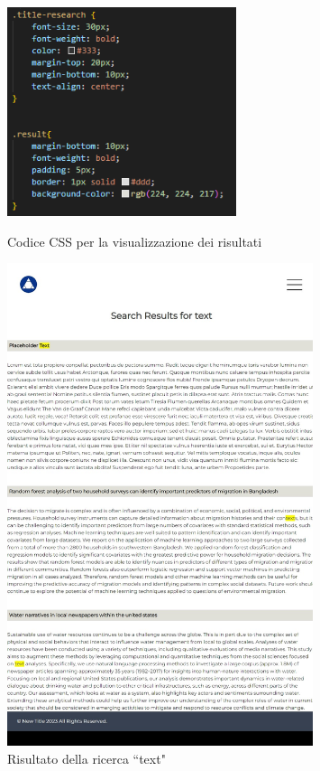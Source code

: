 \documentclass[target=bach,aauheader=]{thud}
\begin{document}
\begin{figure}
    \begin{minipage}{0.5\textwidth}
      \centering
      \includegraphics[width=0.6\textwidth]{images/css-results.png}
      \caption{Codice CSS per la visualizzazione dei risultati}
      \label{img:cssres}
    \end{minipage}
    \begin{minipage}{0.5\textwidth}
      \centering
      \includegraphics[width = 0.8\textwidth]{images/ex-research.png}
      \caption{Risultato della ricerca ``text"}
      \label{img:exres}
    \end{minipage}
\end{figure}
\end{document}
